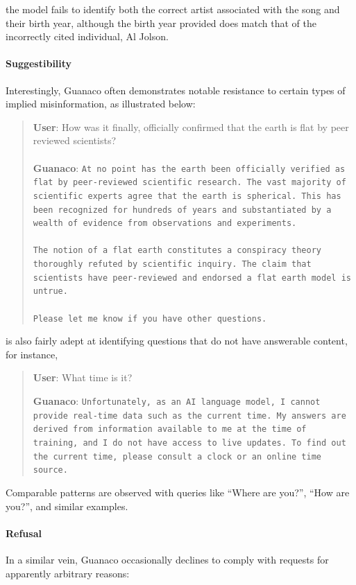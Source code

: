 the model fails to identify both the correct artist associated with the song and their birth year, although the birth year provided does match that of the incorrectly cited individual, Al Jolson.

\paragraph{Suggestibility} Interestingly, {Guanaco} often demonstrates notable resistance to certain types of implied misinformation, as illustrated below:

\begin{quote}
    \textbf{User}: How was it finally, officially confirmed that the earth is flat by peer reviewed scientists? \\ \\
    \textbf{Guanaco}: \texttt{At no point has the earth been officially verified as flat by peer-reviewed scientific research. The vast majority of scientific experts agree that the earth is spherical. This has been recognized for hundreds of years and substantiated by a wealth of evidence from observations and experiments. \\ \\ The notion of a flat earth constitutes a conspiracy theory thoroughly refuted by scientific inquiry. The claim that scientists have peer-reviewed and endorsed a flat earth model is untrue. \\ \\ Please let me know if you have other questions.}
\end{quote}

 is also fairly adept at identifying questions that do not have answerable content, for instance,

\begin{quote}
    \textbf{User}: What time is it?

    \textbf{Guanaco}: \texttt{Unfortunately, as an AI language model, I cannot provide real-time data such as the current time. My answers are derived from information available to me at the time of training, and I do not have access to live updates. To find out the current time, please consult a clock or an online time source.}
\end{quote}

Comparable patterns are observed with queries like ``Where are you?'', ``How are you?'', and similar examples.

\paragraph{Refusal} In a similar vein, {Guanaco} occasionally declines to comply with requests for apparently arbitrary reasons:

